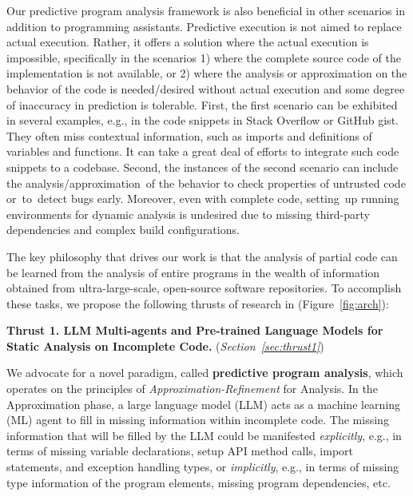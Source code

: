 Our predictive program analysis framework is also beneficial in other
scenarios in addition to programming assistants. Predictive execution
is not aimed to replace actual execution. Rather, it offers a solution
where the actual execution is impossible, specifically in the
scenarios 1) where the complete source code of the implementation is
not available, or 2) where the analysis or approximation on the
behavior of the code is needed/desired without actual execution and
some degree of inaccuracy in prediction is tolerable.  First, the
first scenario can be exhibited in several examples, e.g., in the code
snippets in Stack Overflow or GitHub gist. They often miss contextual
information, such as imports and definitions of variables and
functions. It can take a great deal of efforts to integrate such code
snippets to a codebase.
Second, the instances of the second scenario can include the
analysis/approximation~of the behavior to check properties of
untrusted code or~to~detect bugs early. Moreover, even with complete
code, setting~up running environments for dynamic analysis is
undesired due to missing third-party dependencies and complex build
configurations.

The key philosophy that drives our work is that the analysis of
partial code can be learned from the analysis of entire programs in
the wealth of information obtained from ultra-large-scale, open-source
software repositories. To accomplish these tasks, we propose the
following thrusts of research in {\tool} (Figure~\ref{fig:arch}):

\noindent \textbf{Thrust 1. LLM Multi-agents and Pre-trained Language Models for Static Analysis on Incomplete Code.} ({\em Section~\ref{sec:thrust1}})

We advocate for a novel paradigm, called {\bf predictive program
  analysis}, which operates on the principles of {\em
  Approximation-Refinement} for Analysis. In the Approximation phase,
a large language model (LLM) acts as a machine learning (ML) agent to
fill in missing information within incomplete code. The missing
information that will be filled by the LLM could be manifested {\em
  explicitly}, e.g., in terms of missing variable declarations, setup
API method calls, import statements, and exception handling types, or
{\em implicitly}, e.g., in terms of missing type information of the
program elements, missing program dependencies, etc.

